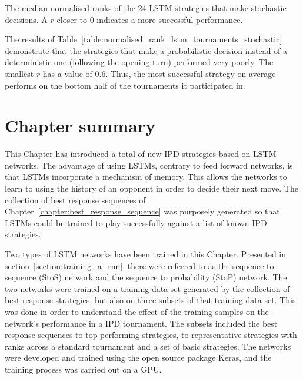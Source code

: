 \begin{table}[!htbp]
    \begin{center}
    \resizebox{.8\textwidth}{!}{
        
    }
\end{center}
\caption{The median normalised ranks of the 24 LSTM strategies that make stochastic
decisions. A \(\bar{r}\) closer to 0 indicates a more successful performance.}
\label{table:normalised_rank_lstm_tournaments_stochastic}
\end{table}

The results of Table~\ref{table:normalised_rank_lstm_tournaments_stochastic}
demonstrate that the strategies that make a probabilistic decision instead of a
deterministic one (following the opening turn) performed very poorly. The
smallest \(\bar{r}\) has a value of 0.6. Thus, the most successful strategy on
average performs on the bottom half of the tournaments it participated in.

\section{Chapter summary}

This Chapter has introduced a total of \lstmstrategies new IPD strategies based
on LSTM networks. The advantage of using LSTMs, contrary to feed forward networks,
is that LSTMs incorporate a mechanism of memory. This allows the networks
to learn to using the history of an opponent in order to decide their next move.
The collection of best response sequences of
Chapter~\ref{chapter:best_response_sequence} was purposely generated so that
LSTMs could be trained to play successfully against a list of known IPD strategies.

Two types of LSTM networks have been trained in this Chapter. Presented in
section~\ref{section:training_a_rnn}, there were referred to as the sequence to
sequence (StoS) network and the sequence to probability (StoP) network. The two
networks were trained on a training data set generated by the collection of best
response strategies, but also on three subsets of that training data set. This
was done in order to understand the effect of the training samples on the
network's performance in a IPD tournament. The subsets included the best
response sequences to top performing strategies, to representative strategies with ranks across
a standard tournament and a set of basic strategies. The networks were developed
and trained using the open source package Keras, and the training process was
carried out on a GPU.

